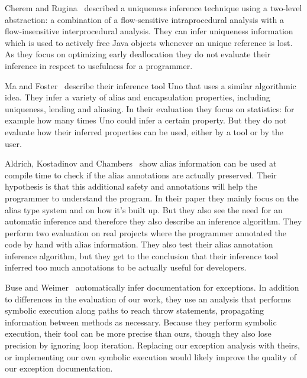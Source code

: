 Cherem and Rugina~\cite{UniquenessInference} described a uniqueness inference
technique using a two-level abstraction: a combination of a flow-sensitive
intraprocedural analysis with a flow-insensitive interprocedural analysis. 
They can infer uniqueness information which is used to actively free Java
objects whenever an unique reference is lost. As they focus on optimizing 
early deallocation they do not evaluate their inference in respect to usefulness
for a programmer.

Ma and Foster~\cite{Uno} describe their inference tool Uno that uses a similar
algorithmic idea. They infer a variety of alias and encapsulation
properties, including uniqueness, lending and aliasing. In their evaluation
they focus on statistics: for example how many times Uno could infer a certain property.
But they do not evaluate how their inferred properties can be used, either by a tool
or by the user.

Aldrich, Kostadinov and Chambers~\cite{AliasJava} show alias information 
can be used at compile time to check if the alias annotations are actually
preserved. Their hypothesis is that this additional safety and annotations will
help the programmer to understand the program. In their paper they mainly focus
on the alias type system and on how it's built up. But they also see the need
for an automatic inference and therefore they also describe an inference algorithm.
They perform two evaluation on real projects where the programmer
annotated the code by hand with alias information. They also test their
alias annotation inference algorithm, but they get to the conclusion that
their inference tool inferred too much annotations to be actually useful
for developers.

Buse and Weimer~\cite{autodoc} automatically infer documentation for
exceptions.  In addition to differences in the evaluation of our work, they use
an analysis that performs symbolic execution along paths to reach throw
statements, propagating information between methods as necessary.
Because they
perform symbolic execution, their tool can be more precise than ours, though
they also lose precision by ignoring loop iteration.
Replacing our exception analysis with theirs, or implementing our own symbolic
execution would likely improve the quality of our exception documentation.
